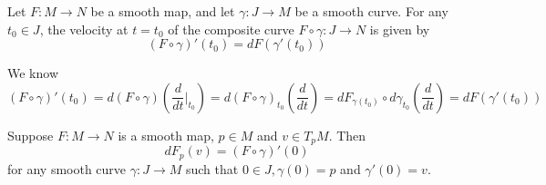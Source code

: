 \begin{proposition}
    Let $F:M\to N$ be a smooth map, and let $\gamma:J\to M$ be a smooth curve. For any $t_0 \in J$, the velocity at $t=t_0$ of the composite curve $F\circ \gamma:J\to N$ is given by
    \[(F\circ \gamma)'(t_0) = dF(\gamma'(t_0))\]
\end{proposition}
\Pf\par
    We know
    \[
    (F\circ \gamma)'(t_0) = d(F\circ \gamma)\left(\dfrac{d}{dt}\Big|_{t_0}\right) = d(F\circ\gamma)_{t_0}\left(\dfrac{d}{dt}\right) = dF_{\gamma(t_0)}\circ d\gamma_{t_0}\left(\dfrac{d}{dt}\right) = dF(\gamma'(t_0))
    \]

\begin{corollary}
    Suppose $F:M\to N$ is a smooth map, $p\in M$ and $v\in T_pM$. Then
    \[dF_p(v)=(F\circ \gamma)'(0)\]
    for any smooth curve $\gamma:J\to M$ such that $0\in J, \gamma(0) = p$ and $\gamma'(0) = v$.
\end{corollary}